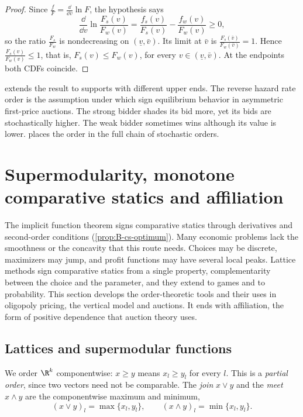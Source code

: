 \begin{proof}
Since $\frac{f}{F} = \frac{\dd}{\dd v}\ln F$, the hypothesis says
\[
  \frac{\dd}{\dd v}\ln\frac{F_s(v)}{F_w(v)} = \frac{f_s(v)}{F_s(v)} - \frac{f_w(v)}{F_w(v)} \geq 0,
\]
so the ratio $\frac{F_s}{F_w}$ is nondecreasing on $(\underline v, \bar v)$. Its limit at $\bar v$ is
$\frac{F_s(\bar v)}{F_w(\bar v)} = 1$. Hence $\frac{F_s(v)}{F_w(v)} \leq 1$, that is, $F_s(v) \leq F_w(v)$, for every
$v \in (\underline v, \bar v)$. At the endpoints both CDFs coincide.
\end{proof}

 extends the result to supports with different upper ends. The reverse hazard rate order is
the assumption under which \citet{MaskinRiley2000} sign equilibrium behavior in asymmetric first-price
auctions. The strong bidder shades its bid more, yet its bids are stochastically higher. The weak bidder sometimes
wins although its value is lower.  places the order in the full chain of
stochastic orders.

\section{Supermodularity, monotone comparative statics and affiliation}\label{sec:B-supermod}

The implicit function theorem signs comparative statics through derivatives and second-order conditions
(\cref{prop:B-cs-optimum}). Many economic problems lack the smoothness or the concavity that this route needs.
Choices may be discrete, maximizers may jump, and profit functions may have several local peaks. Lattice
methods sign comparative statics from a single property, complementarity between the choice and the parameter,
and they extend to games and to probability. This section develops the order-theoretic tools and their uses in
oligopoly pricing, the vertical model and auctions. It ends with affiliation, the form of positive dependence that
auction theory uses.

\subsection{Lattices and supermodular functions}\label{sec:B-lattice}

We order $\R^k$ componentwise: $x \geq y$ means $x_l \geq y_l$ for every $l$. This is a \emph{partial order}, since two
vectors need not be comparable. The \emph{join} $x \vee y$ and the \emph{meet} $x \wedge y$ are the componentwise
maximum and minimum,
\[
  (x \vee y)_l = \max\{x_l, y_l\}, \qquad (x \wedge y)_l = \min\{x_l, y_l\}.
\]

